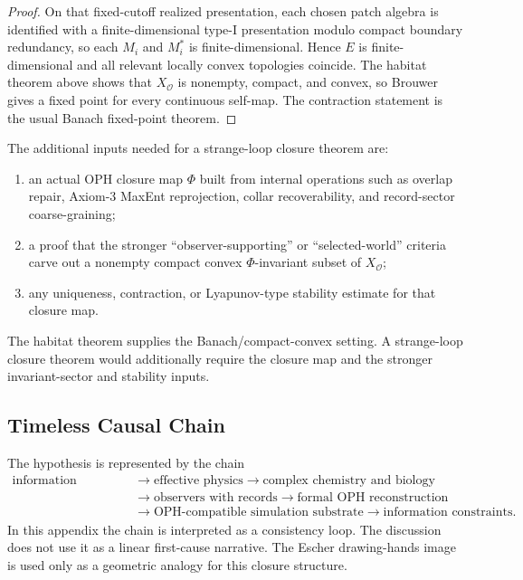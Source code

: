 \begin{proof}
On that fixed-cutoff realized presentation, each chosen patch algebra is identified
with a finite-dimensional type-I presentation modulo compact boundary redundancy, so each \(M_i\)
and \(M_i^*\) is finite-dimensional. Hence \(E\) is finite-dimensional and all relevant locally
convex topologies coincide. The habitat theorem above shows that \(X_{\mathcal O}\) is nonempty,
compact, and convex, so Brouwer gives a fixed point for every continuous self-map. The
contraction statement is the usual Banach fixed-point theorem.
\end{proof}

The additional inputs needed for a strange-loop closure theorem are:
\begin{enumerate}
\item an actual OPH closure map \(\Phi\) built from internal operations such as overlap repair,
Axiom-3 MaxEnt reprojection, collar recoverability, and record-sector coarse-graining;
\item a proof that the stronger ``observer-supporting'' or ``selected-world'' criteria carve out a
nonempty compact convex \(\Phi\)-invariant subset of \(X_{\mathcal O}\);
\item any uniqueness, contraction, or Lyapunov-type stability estimate for that closure map.
\end{enumerate}

The habitat theorem supplies the Banach/compact-convex setting. A strange-loop closure theorem
would additionally require the closure map and the stronger invariant-sector and stability
inputs.

\subsection{Timeless Causal Chain}

The hypothesis is represented by the chain
\[
\begin{aligned}
\text{information constraints}
&\to \text{effective physics}
\to \text{complex chemistry and biology}\\
&\to \text{observers with records}
\to \text{formal OPH reconstruction}\\
&\to \text{OPH-compatible simulation substrate}
\to \text{information constraints}.
\end{aligned}
\]
In this appendix the chain is interpreted as a consistency loop. The discussion does not use it as
a linear first-cause narrative. The Escher drawing-hands image is used only as a geometric
analogy for this closure structure.

